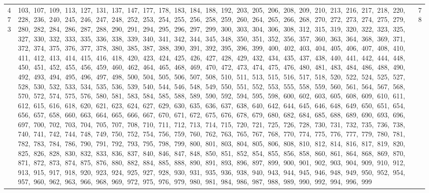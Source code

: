 \begin{longtable}{c|p{}|r}
473 & 103,\ 107,\ 109,\ 113,\ 127,\ 131,\ 137,\ 147,\ 177,\ 178,\ 183,\ 184,\ 188,\ 192,\ 203,\ 205,\ 206,\ 208,\ 209,\ 210,\ 213,\ 216,\ 217,\ 218,\ 220,\ 228,\ 236,\ 240,\ 245,\ 246,\ 247,\ 248,\ 252,\ 253,\ 254,\ 255,\ 256,\ 258,\ 259,\ 260,\ 264,\ 265,\ 266,\ 268,\ 270,\ 272,\ 273,\ 274,\ 275,\ 279,\ 280,\ 282,\ 284,\ 286,\ 287,\ 288,\ 290,\ 291,\ 294,\ 295,\ 296,\ 297,\ 299,\ 300,\ 303,\ 304,\ 306,\ 308,\ 312,\ 315,\ 319,\ 320,\ 322,\ 323,\ 325,\ 327,\ 330,\ 332,\ 333,\ 335,\ 336,\ 338,\ 339,\ 340,\ 341,\ 342,\ 344,\ 345,\ 348,\ 350,\ 351,\ 352,\ 356,\ 357,\ 360,\ 363,\ 364,\ 368,\ 369,\ 371,\ 372,\ 374,\ 375,\ 376,\ 377,\ 378,\ 380,\ 385,\ 387,\ 388,\ 390,\ 391,\ 392,\ 395,\ 396,\ 399,\ 400,\ 402,\ 403,\ 404,\ 405,\ 406,\ 407,\ 408,\ 410,\ 411,\ 412,\ 413,\ 414,\ 415,\ 416,\ 418,\ 420,\ 423,\ 424,\ 425,\ 426,\ 427,\ 428,\ 429,\ 432,\ 434,\ 435,\ 437,\ 438,\ 440,\ 441,\ 442,\ 444,\ 448,\ 450,\ 451,\ 452,\ 455,\ 456,\ 459,\ 460,\ 462,\ 464,\ 465,\ 468,\ 469,\ 470,\ 472,\ 473,\ 474,\ 475,\ 476,\ 480,\ 481,\ 483,\ 484,\ 486,\ 488,\ 490,\ 492,\ 493,\ 494,\ 495,\ 496,\ 497,\ 498,\ 500,\ 504,\ 505,\ 506,\ 507,\ 508,\ 510,\ 511,\ 513,\ 515,\ 516,\ 517,\ 518,\ 520,\ 522,\ 524,\ 525,\ 527,\ 528,\ 530,\ 532,\ 533,\ 534,\ 535,\ 536,\ 539,\ 540,\ 544,\ 546,\ 548,\ 549,\ 550,\ 551,\ 552,\ 553,\ 555,\ 558,\ 559,\ 560,\ 561,\ 564,\ 567,\ 568,\ 570,\ 572,\ 574,\ 575,\ 576,\ 580,\ 581,\ 583,\ 584,\ 585,\ 588,\ 589,\ 590,\ 592,\ 594,\ 595,\ 598,\ 600,\ 602,\ 603,\ 605,\ 608,\ 609,\ 610,\ 611,\ 612,\ 615,\ 616,\ 618,\ 620,\ 621,\ 623,\ 624,\ 627,\ 629,\ 630,\ 635,\ 636,\ 637,\ 638,\ 640,\ 642,\ 644,\ 645,\ 646,\ 648,\ 649,\ 650,\ 651,\ 654,\ 656,\ 657,\ 658,\ 660,\ 663,\ 664,\ 665,\ 666,\ 667,\ 670,\ 671,\ 672,\ 675,\ 676,\ 678,\ 679,\ 680,\ 682,\ 684,\ 685,\ 688,\ 689,\ 690,\ 693,\ 696,\ 697,\ 700,\ 702,\ 703,\ 704,\ 705,\ 707,\ 708,\ 710,\ 711,\ 712,\ 713,\ 714,\ 715,\ 720,\ 721,\ 725,\ 726,\ 728,\ 730,\ 731,\ 732,\ 735,\ 736,\ 738,\ 740,\ 741,\ 742,\ 744,\ 748,\ 749,\ 750,\ 752,\ 754,\ 756,\ 759,\ 760,\ 762,\ 763,\ 765,\ 767,\ 768,\ 770,\ 774,\ 775,\ 776,\ 777,\ 779,\ 780,\ 781,\ 782,\ 783,\ 784,\ 786,\ 790,\ 791,\ 792,\ 793,\ 795,\ 798,\ 799,\ 800,\ 801,\ 803,\ 804,\ 805,\ 806,\ 808,\ 810,\ 812,\ 814,\ 816,\ 817,\ 819,\ 820,\ 825,\ 826,\ 828,\ 830,\ 832,\ 833,\ 836,\ 837,\ 840,\ 846,\ 847,\ 848,\ 850,\ 851,\ 852,\ 854,\ 855,\ 856,\ 858,\ 860,\ 861,\ 864,\ 868,\ 869,\ 870,\ 871,\ 872,\ 873,\ 874,\ 875,\ 876,\ 880,\ 882,\ 884,\ 885,\ 888,\ 890,\ 891,\ 893,\ 896,\ 897,\ 899,\ 900,\ 901,\ 902,\ 903,\ 904,\ 909,\ 910,\ 912,\ 913,\ 915,\ 917,\ 918,\ 920,\ 923,\ 924,\ 925,\ 927,\ 928,\ 930,\ 931,\ 935,\ 936,\ 938,\ 940,\ 943,\ 944,\ 945,\ 946,\ 948,\ 949,\ 950,\ 952,\ 954,\ 957,\ 960,\ 962,\ 963,\ 966,\ 968,\ 969,\ 972,\ 975,\ 976,\ 979,\ 980,\ 981,\ 984,\ 986,\ 987,\ 988,\ 989,\ 990,\ 992,\ 994,\ 996,\ 999 & 78 \\
\end{longtable}
